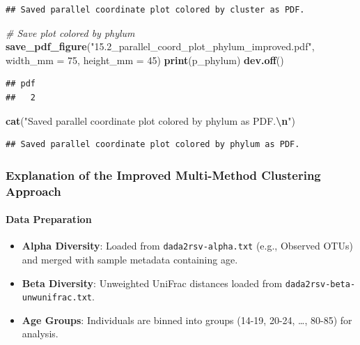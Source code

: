\documentclass[
]{article}
\newenvironment{Shaded}{\begin{snugshade}}{\end{snugshade}}
\newcommand{\AttributeTok}[1]{\textcolor[rgb]{0.13,0.29,0.53}{#1}}
\newcommand{\CommentTok}[1]{\textcolor[rgb]{0.56,0.35,0.01}{\textit{#1}}}
\newcommand{\DecValTok}[1]{\textcolor[rgb]{0.00,0.00,0.81}{#1}}
\newcommand{\FunctionTok}[1]{\textcolor[rgb]{0.13,0.29,0.53}{\textbf{#1}}}
\newcommand{\NormalTok}[1]{#1}
\newcommand{\SpecialCharTok}[1]{\textcolor[rgb]{0.81,0.36,0.00}{\textbf{#1}}}
\newcommand{\StringTok}[1]{\textcolor[rgb]{0.31,0.60,0.02}{#1}}
\providecommand{\tightlist}{%
  \setlength{\itemsep}{0pt}\setlength{\parskip}{0pt}}
\begin{document}
\begin{verbatim}
## Saved parallel coordinate plot colored by cluster as PDF.
\end{verbatim}

\begin{Shaded}
\begin{Highlighting}[]
\CommentTok{\# Save plot colored by phylum}
\FunctionTok{save\_pdf\_figure}\NormalTok{(}\StringTok{"15.2\_parallel\_coord\_plot\_phylum\_improved.pdf"}\NormalTok{, }\AttributeTok{width\_mm =} \DecValTok{75}\NormalTok{, }\AttributeTok{height\_mm =} \DecValTok{45}\NormalTok{)}
\FunctionTok{print}\NormalTok{(p\_phylum)}
\FunctionTok{dev.off}\NormalTok{()}
\end{Highlighting}
\end{Shaded}

\begin{verbatim}
## pdf 
##   2
\end{verbatim}

\begin{Shaded}
\begin{Highlighting}[]
\FunctionTok{cat}\NormalTok{(}\StringTok{"Saved parallel coordinate plot colored by phylum as PDF.}\SpecialCharTok{\textbackslash{}n}\StringTok{"}\NormalTok{)}
\end{Highlighting}
\end{Shaded}

\begin{verbatim}
## Saved parallel coordinate plot colored by phylum as PDF.
\end{verbatim}

\subsubsection{Explanation of the Improved Multi-Method Clustering
Approach}\label{explanation-of-the-improved-multi-method-clustering-approach}

\paragraph{\texorpdfstring{\textbf{Data
Preparation}}{Data Preparation}}\label{data-preparation}

\begin{itemize}
\tightlist
\item
  \textbf{Alpha Diversity}: Loaded from \texttt{dada2rsv-alpha.txt}
  (e.g., Observed OTUs) and merged with sample metadata containing age.
\item
  \textbf{Beta Diversity}: Unweighted UniFrac distances loaded from
  \texttt{dada2rsv-beta-unwunifrac.txt}.
\item
  \textbf{Age Groups}: Individuals are binned into groups (14-19, 20-24,
  \ldots, 80-85) for analysis.
\end{itemize}
\end{document}
